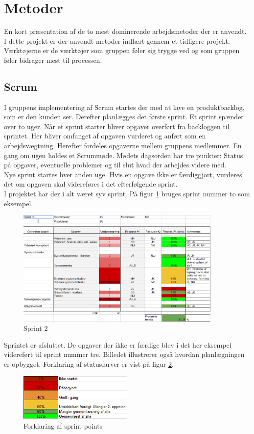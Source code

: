 \section{Metoder}
\label{ch:metoder}
En kort præsentation af de to mest dominerende arbejdsmetoder der er anvendt.\\

I dette projekt er der anvendt metoder indlært gennem et tidligere projekt. Værktøjerne er de værktøjer som gruppen føler sig trygge ved og som gruppen føler bidrager mest til processen. 
\subsection{Scrum}
I gruppens implementering af Scrum startes der med at lave en produktbacklog, som er den kunden ser.  Derefter planlægges det første sprint. Et sprint spænder over to uger. Når et sprint starter bliver opgaver overført fra backloggen til sprintet. Her bliver omfanget af opgaven vurderet og anført som en arbejdsvægtning. Herefter fordeles opgaverne mellem gruppens medlemmer. En gang om ugen holdes et Scrummøde. Mødets dagsorden har tre punkter: Status på opgaver, eventuelle problemer og til slut hvad der arbejdes videre med. \\
Nye sprint startes hver anden uge. Hvis en opgave ikke er færdiggjort, vurderes det om opgaven skal videreføres i det efterfølgende sprint.\\
I projektet har der i alt været syv sprint. På figur \ref{fig:SCRUM} bruges sprint nummer to som eksempel.
\begin{figure}[H]
\centering
\includegraphics[width=0.9\textwidth]{billeder/SCRUM1}
\caption{Sprint 2}
\label{fig:SCRUM}
\end{figure}
Sprintet er afsluttet. De opgaver der ikke er færdige blev i det her eksempel videreført til sprint nummer tre. Billedet illustrerer også hvordan planlægningen er opbygget. Forklaring af statusfarver er vist på figur \ref{fig:SCRUM2}.
\begin{figure}[H]
\centering
\includegraphics[width=0.5\textwidth]{billeder/SCRUM2}
\caption{Forklaring af sprint points}
\label{fig:SCRUM2}
\end{figure}
